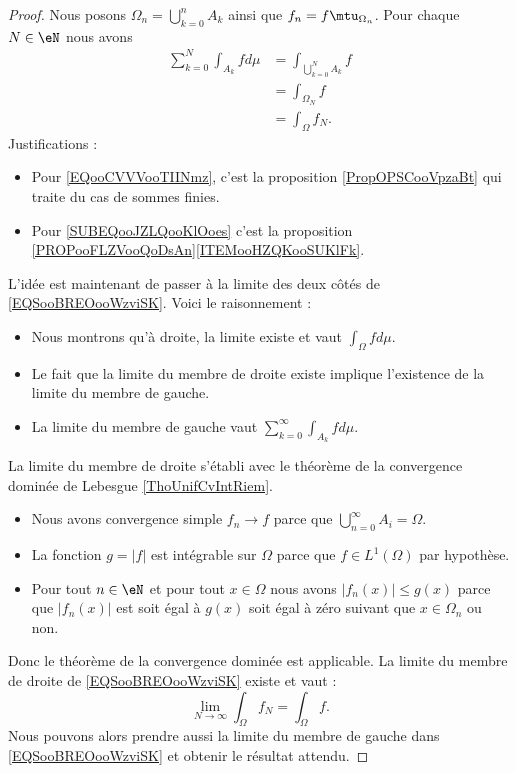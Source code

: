 \begin{proof}
    Nous posons \( \Omega_n=\bigcup_{k=0}^nA_k\) ainsi que \( f_n=f\mtu_{\Omega_n}\). Pour chaque \( N\in \eN\) nous avons
    \begin{subequations}        \label{EQSooBREOooWzviSK}
        \begin{align}
            \sum_{k=0}^N\int_{A_k}fd\mu&=\int_{\bigcup_{k=0}^NA_k}f     \label{EQooCVVVooTIINmz}\\
            &=\int_{\Omega_N}f\\
            &=\int_{\Omega}f_N.     \label{SUBEQooJZLQooKlOoes}
        \end{align}
    \end{subequations}
    Justifications :
    \begin{itemize}
        \item Pour \eqref{EQooCVVVooTIINmz}, c'est la proposition \ref{PropOPSCooVpzaBt} qui traite du cas de sommes finies.
        \item Pour \eqref{SUBEQooJZLQooKlOoes}  c'est la proposition \ref{PROPooFLZVooQoDsAn}\ref{ITEMooHZQKooSUKlFk}.
    \end{itemize}
    L'idée est maintenant de passer à la limite des deux côtés de \eqref{EQSooBREOooWzviSK}. Voici le raisonnement :
    \begin{itemize}
        \item Nous montrons qu'à droite, la limite existe et vaut \( \int_{\Omega}fd\mu\).
        \item Le fait que la limite du membre de droite existe implique l'existence de la limite du membre de gauche.
        \item La limite du membre de gauche vaut \( \sum_{k=0}^{\infty}\int_{A_k}fd\mu\).
    \end{itemize}
    La limite du membre de droite s'établi avec le théorème de la convergence dominée de Lebesgue \ref{ThoUnifCvIntRiem}.
    \begin{itemize}
        \item Nous avons convergence simple \( f_n\to f\) parce que \( \bigcup_{n=0}^{\infty}A_i=\Omega\).
        \item La fonction \( g=| f |\) est intégrable sur \( \Omega\) parce que \( f\in L^1(\Omega)\) par hypothèse.
        \item Pour tout \( n\in \eN\) et pour tout \( x\in \Omega\) nous avons \( | f_n(x) |\leq g(x)\) parce que \( | f_n(x) |\) est soit égal à \( g(x)\) soit égal à zéro suivant que \( x\in \Omega_n\) ou non.
    \end{itemize}
    Donc le théorème de la convergence dominée est applicable. La limite du membre de droite de \eqref{EQSooBREOooWzviSK} existe et vaut :
    \begin{equation}
        \lim_{N\to \infty} \int_{\Omega}f_N=\int_{\Omega}f.
    \end{equation}
    Nous pouvons alors prendre aussi la limite du membre de gauche dans \eqref{EQSooBREOooWzviSK} et obtenir le résultat attendu.
\end{proof}

